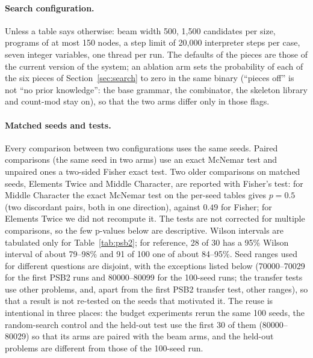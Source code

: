 \documentclass[sigconf,nonacm]{acmart}
\begin{document}
\paragraph{Search configuration.}
Unless a table says otherwise: beam width 500, 1,500 candidates per size, programs of at most 150 nodes, a step limit of 20,000
interpreter steps per case, seven integer variables, one thread per run. The defaults of the pieces are those of the current
version of the system; an ablation arm sets the probability of each of the six pieces of Section~\ref{sec:search} to zero in the same binary (``pieces off'' is not ``no prior knowledge'': the base grammar, the combinator, the skeleton library and count-mod stay on),
so that the two arms differ only in those flags.

\paragraph{Matched seeds and tests.}
Every comparison between two configurations uses the same seeds. Paired comparisons (the same seed in two arms) use an exact McNemar test and unpaired ones a two-sided Fisher exact test. Two older comparisons on matched seeds, Elements Twice and Middle Character, are reported with Fisher's test: for Middle Character the exact McNemar test on the per-seed tables gives $p=0.5$ (two discordant pairs, both in one direction), against $0.49$ for Fisher; for Elements Twice we did not recompute it. The tests are not corrected for multiple comparisons, so the few p-values below are descriptive. Wilson intervals are tabulated only for Table~\ref{tab:psb2}; for reference, 28 of 30 has a 95\% Wilson interval of about 79--98\% and 91 of 100 one of about 84--95\%. Seed ranges used for different questions are disjoint, with the exceptions listed below
(70000--70029 for the first PSB2 runs and 80000--80099 for the 100-seed runs; the transfer tests use other problems, and, apart from the first
PSB2 transfer test, other ranges), so that a result is not re-tested on the seeds that
motivated it. The reuse is intentional in three places: the budget experiments rerun the same 100 seeds, the random-search control and the held-out test use the first 30 of them (80000--80029) so that its arms are paired with the beam arms, and the held-out problems are different from those of the 100-seed run.
\end{document}

